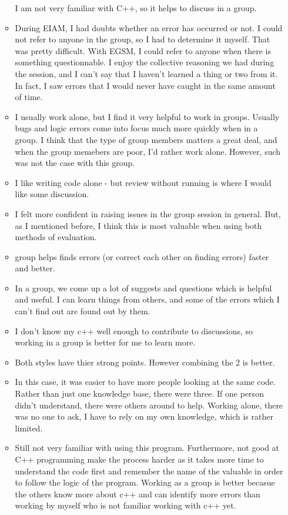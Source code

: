 \begin{enumerate}
\begin{itemize}
I am not very familiar with C++, so it helps to discuss in a group.
\item During EIAM, I had doubts whether an error has occurred or not.  I
could not refer to anyone in the group, so I had to determine it
myself.  That was pretty difficult.  With EGSM, I could refer to
anyone when there is something questionnable.  I enjoy the collective
reasoning we had during the session, and I can't say that I haven't
learned a thing or two from it.  In fact, I saw errors that I would
never have caught in the same amount of time.
\item I usually work alone, but I find it very helpful to work in groups.
Usually
bugs and logic errors come into focus much more quickly when in a
group.  I think that the type of group members matters a great deal,
and when the group memebers are poor, I'd rather work alone.  However,
such was not the case with this group.
\item I like writing code alone - but review without running is where I
would like some discussion.
\item I felt more confident in raising issues in the group session in
general. But, as I mentioned before, I think this is most valuable
when using both methods of evaluation.
\item group helps finds errors (or correct each other on finding errors)
faster and better.

\item In a group, we come up a lot of suggests and questions which is
helpful and useful.  I can learn things from others, and some of the
errors which I can't find out are found out by them.


\item I don't know my c++ well enough to contribute to discussions, so
working in a group is better for me to learn more.
\item Both styles have thier strong points.  However combining the 2 is better.
\item In this case, it was easier to have more people looking at the same
code.  Rather than just one knowledge base, there were three.  If one
person didn't understand, there were others around to help.  Working
alone, there was no one to ask, I have to rely on my own knowledge,
which is rather limited.

\item Still not very familiar with using this program.  Furthermore, not
good at C++ programming make the process harder as it takes more time
to understand the code first and remember the name of the valuable in
order to follow the logic of the program.  Working as a group is
better becasue the others know more about c++ and can identify more
errors than working by myself who is not familiar working with c++
yet.  


\end{itemize}
\end{enumerate}
